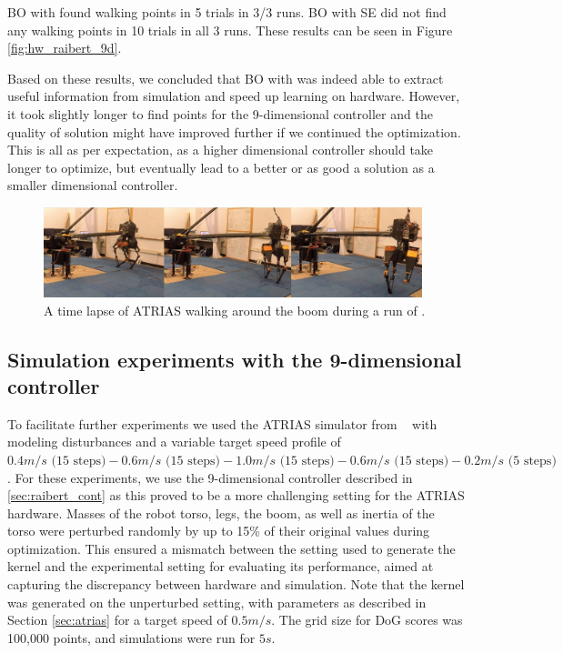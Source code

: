 BO with \dogkernel found walking points in 5 trials in 3/3 runs. BO with SE did not find any walking points in 10 trials in all 3 runs. These results can be seen in Figure \ref{fig:hw_raibert_9d}.

Based on these results, we concluded that BO with \dogkernel was indeed able to extract useful information from simulation and speed up learning on hardware. However, it took slightly longer to find points for the 9-dimensional controller and the quality of solution might have improved further if we continued the optimization. This is all as per expectation, as a higher dimensional controller should take longer to optimize, but eventually lead to a better or as good a solution as a smaller dimensional controller. 

\begin{figure}
\centering
\includegraphics[width=0.98\textwidth]{img/atrias_time_lapse.jpg}
\caption{\small{A time lapse of ATRIAS walking around the boom during a run of \dogkernel.}}
\label{fig:bo_runs_atrias_hw_slides}
\end{figure}


\subsection{Simulation experiments with the 9-dimensional controller}

\label{sec:exps_sim}

To facilitate further experiments we used the ATRIAS simulator from ~\cite{martin2015robust} with modeling disturbances and a variable target speed profile of $0.4 m/s \text{ (15 steps)} - 0.6 m/s \text{ (15 steps)} - 1.0 m/s \text{ (15 steps)} - 0.6 m/s \text{ (15 steps)} - 0.2 m/s \text{ (5 steps)}$. For these experiments, we use the 9-dimensional controller described in \ref{sec:raibert_cont} as this proved to be a more challenging setting for the ATRIAS hardware. Masses of the robot torso, legs, the boom, as well as inertia of the torso were perturbed randomly by up to 15\% of their original values during optimization. This ensured a mismatch between the setting used to generate the kernel and the experimental setting for evaluating its performance, aimed at capturing the discrepancy between hardware and simulation. Note that the kernel was generated on the unperturbed setting, with parameters as described in Section \ref{sec:atrias} for a target speed of $0.5m/s$. The grid size for DoG scores was 100,000 points, and simulations were run for $5s$.

